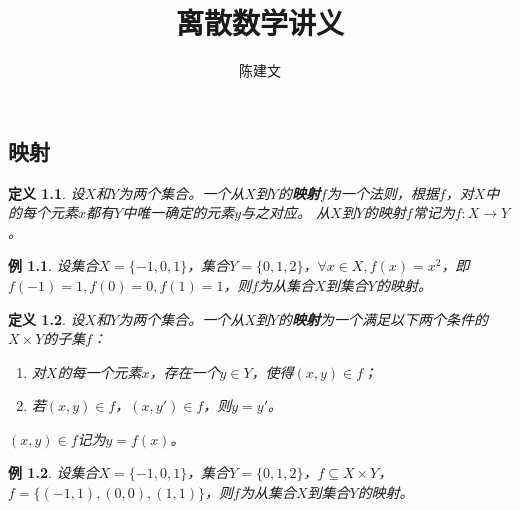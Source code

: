 \documentclass{book}[oneside]
\newtheorem{Def}{定义}[chapter]
\newtheorem*{Example}{例}
\begin{document}
\begin{CJK*}{UTF8}{gbsn}
  \title{离散数学讲义}
  \author{陈建文}
  \maketitle
  
 

  \setcounter{chapter}{1}
  \chapter{映射}

  \begin{Def}
    设$X$和$Y$为两个集合。一个从$X$到$Y$的{\bfseries 映射}$f$为一个法则，根据$f$，对$X$中的每个元素$x$都有$Y$中唯一确定的元素$y$与之对应。
    从$X$到$Y$的映射$f$常记为$f:X\to Y$。
  \end{Def}

  \begin{Example}
    设集合$X=\{-1,0,1\}$，集合$Y=\{0,1,2\}$，$\forall x \in X, f(x)=x^2$，即$f(-1)=1,f(0)=0,f(1)=1$，则$f$为从集合$X$到集合$Y$的映射。
  \end{Example}

  
  \begin{Def}
    设$X$和$Y$为两个集合。一个从$X$到$Y$的{\bfseries 映射}为一个满足以下两个条件的$X\times Y$的子集$f$：
    \begin{enumerate}
    \item 对$X$的每一个元素$x$，存在一个$y\in Y$，使得$(x,y) \in f$；
    \item 若$(x,y)\in f$，$(x,y')\in f$，则$y=y'$。
    \end{enumerate}
    $(x,y)\in f$记为$y=f(x)$。
  \end{Def}
  \begin{Example}
    设集合$X=\{-1,0,1\}$，集合$Y=\{0,1,2\}$，$f\subseteq X \times Y$，$f=\{(-1,1),(0,0),(1,1)\}$，则$f$为从集合$X$到集合$Y$的映射。
  \end{Example}


\end{CJK*}
\end{document}
